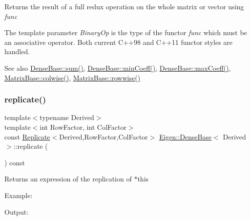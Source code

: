 \begin{DoxyReturn}{Returns}
the result of a full redux operation on the whole matrix or vector using {\itshape func} 
\end{DoxyReturn}
The template parameter {\itshape Binary\+Op} is the type of the functor {\itshape func} which must be an associative operator. Both current C++98 and C++11 functor styles are handled.

\begin{DoxySeeAlso}{See also}
\mbox{\hyperlink{class_eigen_1_1_dense_base_a4dee689c76ff86da9d8e49950604597b}{Dense\+Base\+::sum()}}, \mbox{\hyperlink{class_eigen_1_1_dense_base_a6634944be3d4fef551b57ffad30467f2}{Dense\+Base\+::min\+Coeff()}}, \mbox{\hyperlink{class_eigen_1_1_dense_base_ac0d151ec47eb7a44a3a5ba1587ddbeb4}{Dense\+Base\+::max\+Coeff()}}, \mbox{\hyperlink{class_eigen_1_1_dense_base_a1c0e1b6067ec1de6cb8799da55aa7d30}{Matrix\+Base\+::colwise()}}, \mbox{\hyperlink{class_eigen_1_1_dense_base_a6daa3a3156ca0e0722bf78638e1c7f28}{Matrix\+Base\+::rowwise()}} 
\end{DoxySeeAlso}
\mbox{\label{class_eigen_1_1_dense_base_a8a4236585a41142538e80370f466b590}} 
\subsubsection{\texorpdfstring{replicate()}{replicate()}\hspace{0.1cm}{\footnotesize\ttfamily [1/2]}}
{\footnotesize\ttfamily template$<$typename Derived$>$ \\
template$<$int Row\+Factor, int Col\+Factor$>$ \\
const \mbox{\hyperlink{class_eigen_1_1_replicate}{Replicate}}$<$Derived,Row\+Factor,Col\+Factor$>$ \mbox{\hyperlink{class_eigen_1_1_dense_base}{Eigen\+::\+Dense\+Base}}$<$ Derived $>$\+::replicate (\begin{DoxyParamCaption}{ }\end{DoxyParamCaption}) const}

\begin{DoxyReturn}{Returns}
an expression of the replication of {\ttfamily $\ast$this} 
\end{DoxyReturn}
Example\+: 
\begin{DoxyCodeInclude}{0}
\end{DoxyCodeInclude}
 Output\+: 
\begin{DoxyVerbInclude}
\end{DoxyVerbInclude}


